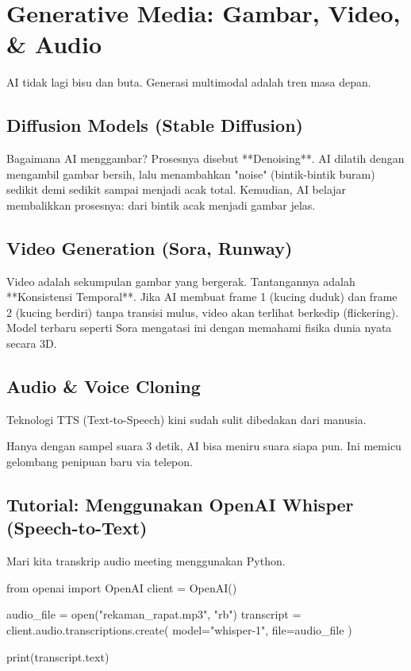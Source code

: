 \chapter{Generative Media: Gambar, Video, \& Audio}
\label{chap:gen_media}

AI tidak lagi bisu dan buta. Generasi multimodal adalah tren masa depan.

\section{Diffusion Models (Stable Diffusion)}

Bagaimana AI menggambar?
Prosesnya disebut **Denoising**. AI dilatih dengan mengambil gambar bersih, lalu menambahkan "noise" (bintik-bintik buram) sedikit demi sedikit sampai menjadi acak total.
Kemudian, AI belajar membalikkan prosesnya: dari bintik acak menjadi gambar jelas.

\section{Video Generation (Sora, Runway)}

Video adalah sekumpulan gambar yang bergerak. Tantangannya adalah **Konsistensi Temporal**.
Jika AI membuat frame 1 (kucing duduk) dan frame 2 (kucing berdiri) tanpa transisi mulus, video akan terlihat berkedip (flickering). Model terbaru seperti Sora mengatasi ini dengan memahami fisika dunia nyata secara 3D.

\section{Audio \& Voice Cloning}

Teknologi TTS (Text-to-Speech) kini sudah sulit dibedakan dari manusia.

\begin{codeblock}[title=Bahaya Voice Cloning]
Hanya dengan sampel suara 3 detik, AI bisa meniru suara siapa pun. Ini memicu gelombang penipuan baru via telepon.
\end{codeblock}

\section{Tutorial: Menggunakan OpenAI Whisper (Speech-to-Text)}

Mari kita transkrip audio meeting menggunakan Python.

\begin{codeblock}[language=Python]
from openai import OpenAI
client = OpenAI()

audio_file = open("rekaman_rapat.mp3", "rb")
transcript = client.audio.transcriptions.create(
  model="whisper-1",
  file=audio_file
)

print(transcript.text)
\end{codeblock}
